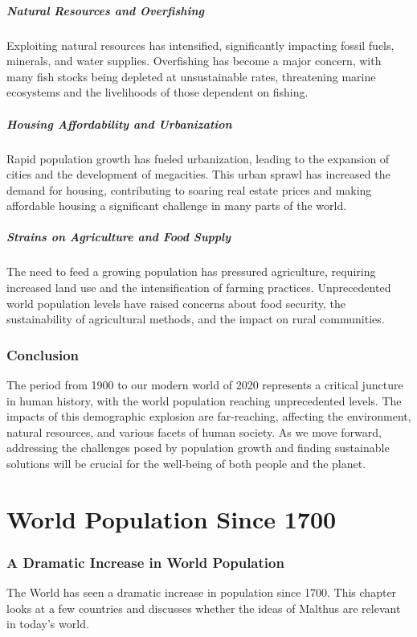 \documentclass[a4paper,12pt]{book}
\begin{document}
\paragraph{Natural Resources and Overfishing}
Exploiting natural resources has intensified, significantly impacting fossil fuels, minerals, and water supplies. Overfishing has become a major concern, with many fish stocks being depleted at unsustainable rates, threatening marine ecosystems and the livelihoods of those dependent on fishing.

\paragraph{Housing Affordability and Urbanization}
Rapid population growth has fueled urbanization, leading to the expansion of cities and the development of megacities. This urban sprawl has increased the demand for housing, contributing to soaring real estate prices and making affordable housing a significant challenge in many parts of the world.

\paragraph{Strains on Agriculture and Food Supply}
The need to feed a growing population has pressured agriculture, requiring increased land use and the intensification of farming practices. Unprecedented world population levels have raised concerns about food security, the sustainability of agricultural methods, and the impact on rural communities.

\subsection*{Conclusion}
The period from 1900 to our modern world of 2020 represents a critical juncture in human history, with the world population reaching unprecedented levels. The impacts of this demographic explosion are far-reaching, affecting the environment, natural resources, and various facets of human society. As we move forward, addressing the challenges posed by population growth and finding sustainable solutions will be crucial for the well-being of both people and the planet.

\chapter{World Population Since 1700}
\subsection*{A Dramatic Increase in World Population}
The World has seen a dramatic increase in population since 1700. This chapter looks at a few countries and discusses whether the ideas of Malthus are relevant in today's world.
\end{document}
